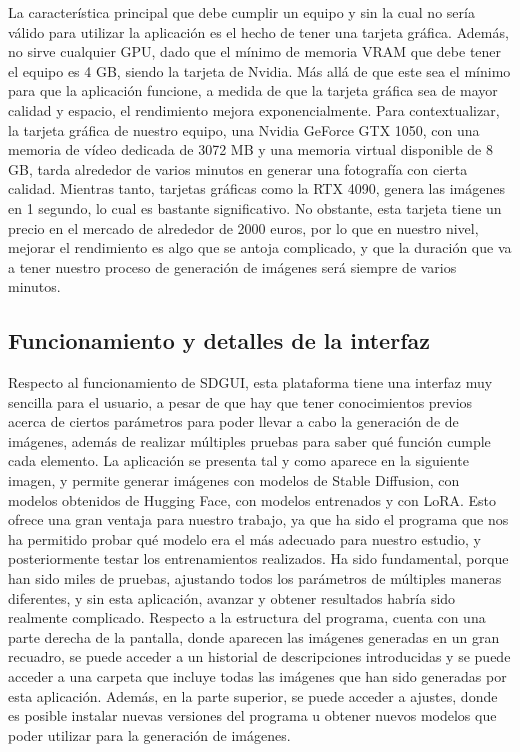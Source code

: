 La característica principal que debe cumplir un equipo y sin la cual no sería válido para utilizar la aplicación es el hecho de tener una tarjeta gráfica. Además, no sirve cualquier GPU, dado que el mínimo de memoria VRAM que debe tener el equipo es 4 GB, siendo la tarjeta de Nvidia. Más allá de que este sea el mínimo para que la aplicación funcione, a medida de que la tarjeta gráfica sea de mayor calidad y espacio, el rendimiento mejora exponencialmente. Para contextualizar, la tarjeta gráfica de nuestro equipo, una Nvidia GeForce GTX 1050, con una memoria de vídeo dedicada de 3072 MB y una memoria virtual disponible de 8 GB, tarda alrededor de varios minutos en generar una fotografía con cierta calidad. Mientras tanto, tarjetas gráficas como la RTX 4090, genera las imágenes en 1 segundo, lo cual es bastante significativo. No obstante, esta tarjeta tiene un precio en el mercado de alrededor de 2000 euros, por lo que en nuestro nivel, mejorar el rendimiento es algo que se antoja complicado, y que la duración que va a tener nuestro proceso de generación de imágenes será siempre de varios minutos.\\


\subsection{Funcionamiento y detalles de la interfaz}

 Respecto al funcionamiento de SDGUI, esta plataforma tiene una interfaz muy sencilla para el usuario, a pesar de que hay que tener conocimientos previos acerca de ciertos parámetros para poder llevar a cabo la generación de de imágenes, además de realizar múltiples pruebas para saber qué función cumple cada elemento. La aplicación se presenta tal y como aparece en la siguiente imagen, y permite generar imágenes con modelos de Stable Diffusion, con modelos obtenidos de Hugging Face, con modelos entrenados y con LoRA. Esto ofrece una gran ventaja para nuestro trabajo, ya que ha sido el programa que nos ha permitido probar qué modelo era el más adecuado para nuestro estudio, y posteriormente testar los entrenamientos realizados. Ha sido fundamental, porque han sido miles de pruebas, ajustando todos los parámetros de múltiples maneras diferentes, y sin esta aplicación, avanzar y obtener resultados habría sido realmente complicado. Respecto a la estructura del programa, cuenta con una parte derecha de la pantalla, donde aparecen las imágenes generadas en un gran recuadro, se puede acceder a un historial de descripciones introducidas y se puede acceder a una carpeta que incluye todas las imágenes que han sido generadas por esta aplicación. Además, en la parte superior, se puede acceder a ajustes, donde es posible instalar nuevas versiones del programa u obtener nuevos modelos que poder utilizar para la generación de imágenes. \\
 
